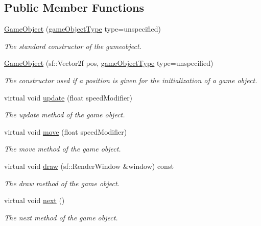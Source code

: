 \subsection*{Public Member Functions}
\begin{DoxyCompactItemize}
\item 
\hyperlink{class_game_object_a8aa723c1cff01c9f4d33f14f89fd13c0}{Game\+Object} (\hyperlink{class_game_object_ad5092169e581fb0772e01026882ea0c8}{game\+Object\+Type} type=unspecified)
\begin{DoxyCompactList}\small\item\em The standard constructor of the gameobject. \end{DoxyCompactList}\item 
\hyperlink{class_game_object_a94e0628569cb8b4c40738472d7e21caa}{Game\+Object} (sf\+::\+Vector2f pos, \hyperlink{class_game_object_ad5092169e581fb0772e01026882ea0c8}{game\+Object\+Type} type=unspecified)
\begin{DoxyCompactList}\small\item\em The constructor used if a position is given for the initialization of a game object. \end{DoxyCompactList}\item 
virtual void \hyperlink{class_game_object_acf6423054877d1344b6e0b1f4e740df5}{update} (float speed\+Modifier)
\begin{DoxyCompactList}\small\item\em The update method of the game object. \end{DoxyCompactList}\item 
virtual void \hyperlink{class_game_object_a5929b9837b72ea7d82fda6c5719dd348}{move} (float speed\+Modifier)
\begin{DoxyCompactList}\small\item\em The move method of the game object. \end{DoxyCompactList}\item 
virtual void \hyperlink{class_game_object_ae6e4f8704ff32dbd42990ba63954c340}{draw} (sf\+::\+Render\+Window \&window) const 
\begin{DoxyCompactList}\small\item\em The draw method of the game object. \end{DoxyCompactList}\item 
virtual void \hyperlink{class_game_object_a9c6a1cca4f64b9de43035c644b06ed6b}{next} ()
\begin{DoxyCompactList}\small\item\em The next method of the game object. \end{DoxyCompactList}\item 

\end{DoxyCompactItemize}
